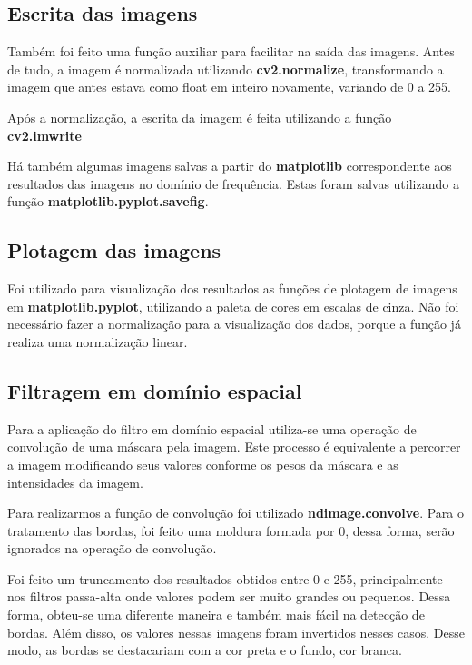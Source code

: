\documentclass{article}
\begin{document}
\subsection{Escrita das imagens}

Também foi feito uma função auxiliar para facilitar na saída das imagens. Antes de tudo, a imagem é normalizada utilizando \textbf{cv2.normalize}, transformando a imagem que antes estava como float em inteiro novamente, variando de 0 a 255.

Após a normalização, a escrita da imagem é feita utilizando a função \textbf{cv2.imwrite} 

Há também algumas imagens salvas a partir do \textbf{matplotlib} correspondente aos resultados das imagens no domínio de frequência. Estas foram salvas utilizando a função \textbf{matplotlib.pyplot.savefig}. 

\subsection{Plotagem das imagens}

Foi utilizado para visualização dos resultados as funções de plotagem de imagens em \textbf{matplotlib.pyplot}, utilizando a paleta de cores em escalas de cinza. Não foi necessário fazer a normalização para a visualização dos dados, porque a função já realiza uma normalização linear.

\subsection{Filtragem em domínio espacial}

Para a aplicação do filtro em domínio espacial utiliza-se uma operação de convolução de uma máscara pela imagem. Este processo é equivalente a percorrer a imagem modificando seus valores conforme os pesos da máscara e as intensidades da imagem. 

Para realizarmos a função de convolução foi utilizado \textbf{ndimage.convolve}. Para o tratamento das bordas, foi feito uma moldura formada por 0, dessa forma, serão ignorados na operação de convolução.

Foi feito um truncamento dos resultados obtidos entre 0 e 255, principalmente nos filtros passa-alta onde valores podem ser muito grandes ou pequenos. Dessa forma, obteu-se uma diferente maneira e também mais fácil na detecção de bordas. Além disso, os valores nessas imagens foram invertidos nesses casos. Desse modo, as bordas se destacariam com a cor preta e o fundo, cor branca.
\end{document}
